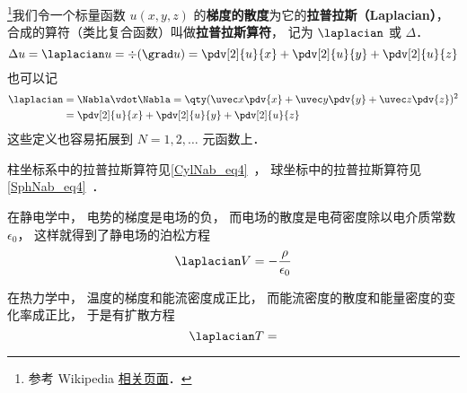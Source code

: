 
\begin{issues}
\issueDraft
\end{issues}


\footnote{参考 Wikipedia \href{https://en.wikipedia.org/wiki/Laplace_operator}{相关页面}．}我们令一个标量函数 $u(x, y, z)$ 的\textbf{梯度的散度}为它的\textbf{拉普拉斯（Laplacian）}， 合成的算符（类比复合函数）叫做\textbf{拉普拉斯算符}， 记为 $\laplacian$ 或 $\Delta$．
\begin{equation}
\Delta u = \laplacian u = \div (\grad u) = \pdv[2]{u}{x} + \pdv[2]{u}{y} + \pdv[2]{u}{z}
\end{equation}
也可以记
\begin{equation}
\begin{aligned}
\laplacian &= \Nabla \vdot \Nabla = \qty(\uvec x\pdv{x} + \uvec y\pdv{y} + \uvec z\pdv{z})^2\\
&= \pdv[2]{u}{x} + \pdv[2]{u}{y} + \pdv[2]{u}{z}
\end{aligned}
\end{equation}
这些定义也容易拓展到 $N = 1, 2, \dots$ 元函数上．

柱坐标系中的拉普拉斯算符见\autoref{CylNab_eq4}~， 球坐标中的拉普拉斯算符见\autoref{SphNab_eq4}~．

在静电学中， 电势的梯度是电场的负， 而电场的散度是电荷密度除以电介质常数 $\epsilon_0$， 这样就得到了静电场的泊松方程
\begin{equation}
\laplacian V = -\frac{\rho}{\epsilon_0}
\end{equation}

在热力学中， 温度的梯度和能流密度成正比， 而能流密度的散度和能量密度的变化率成正比， 于是有扩散方程
\begin{equation}
\laplacian T = 
\end{equation}

